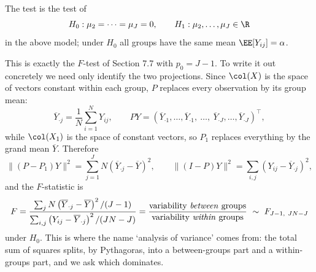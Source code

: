 \begin{definition}
  The  test is the test of
  $$
  H_0 : \mu_2 = \cdots = \mu_J = 0, \qquad H_1 : \mu_2,\dots,\mu_J \in \R
  $$
  in the above model; under $H_0$ all groups have the same mean $\EE[Y_{ij}] = \alpha$.
\end{definition}

This is exactly the $F$-test of Section 7.7 with $p_0 = J-1$. To write it out concretely we need only identify the two projections. Since $\col(X)$ is the space of vectors constant within each group, $P$ replaces every observation by its group mean:
$$
\overline{Y}_{\cdot j} = \frac1N\sum_{i=1}^{N}Y_{ij}, \qquad PY = \left(\overline{Y}_{\cdot 1},\dots,\overline{Y}_{\cdot 1},\ \dots,\ \overline{Y}_{\cdot J},\dots,\overline{Y}_{\cdot J}\right)^\top,
$$
while $\col(X_1)$ is the space of constant vectors, so $P_1$ replaces everything by the grand mean $\overline{Y}$. Therefore
$$
\|(P-P_1)Y\|^2 = \sum_{j=1}^{J}N\left(\overline{Y}_{\cdot j}-\overline{Y}\right)^2, \qquad \|(I-P)Y\|^2 = \sum_{i,j}\left(Y_{ij}-\overline{Y}_{\cdot j}\right)^2,
$$
and the $F$-statistic is
$$
F = \frac{\sum_{j}N\left(\overline{Y}_{\cdot j}-\overline{Y}\right)^2/(J-1)}{\sum_{i,j}\left(Y_{ij}-\overline{Y}_{\cdot j}\right)^2/(JN-J)} = \frac{\text{variability \emph{between} groups}}{\text{variability \emph{within} groups}}\ \sim\ F_{J-1,\ JN-J}
$$
under $H_0$. This is where the name `analysis of variance' comes from: the total sum of squares splits, by Pythagoras, into a between-groups part and a within-groups part, and we ask which dominates.

